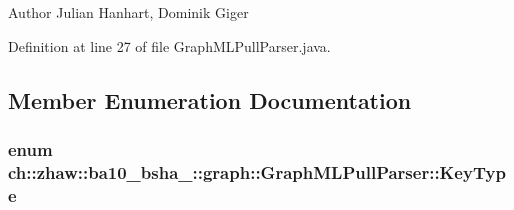 \begin{DoxyAuthor}{Author}
Julian Hanhart, Dominik Giger 
\end{DoxyAuthor}


Definition at line 27 of file GraphMLPullParser.java.

\subsection{Member Enumeration Documentation}
\hypertarget{classch_1_1zhaw_1_1ba10__bsha__1_1_1graph_1_1GraphMLPullParser_aaa46f90276e81808deff1bae71e7e97a}{
\subsubsection[{KeyType}]{\setlength{\rightskip}{0pt plus 5cm}enum {\bf ch::zhaw::ba10\_\-bsha\_::graph::GraphMLPullParser::KeyType}}}
\label{classch_1_1zhaw_1_1ba10__bsha__1_1_1graph_1_1GraphMLPullParser_aaa46f90276e81808deff1bae71e7e97a}
